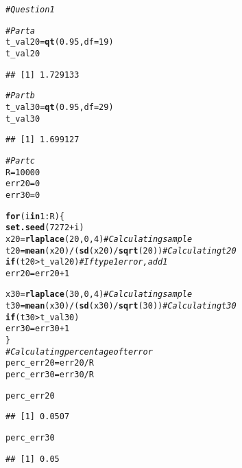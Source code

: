 \documentclass{article}\usepackage[]{graphicx}\usepackage[]{xcolor}
\makeatletter
\newcommand{\hlnum}[1]{\textcolor[rgb]{0.686,0.059,0.569}{#1}}%
\newcommand{\hlcom}[1]{\textcolor[rgb]{0.678,0.584,0.686}{\textit{#1}}}%
\newcommand{\hlopt}[1]{\textcolor[rgb]{0,0,0}{#1}}%
\newcommand{\hldef}[1]{\textcolor[rgb]{0.345,0.345,0.345}{#1}}%
\newcommand{\hlkwa}[1]{\textcolor[rgb]{0.161,0.373,0.58}{\textbf{#1}}}%
\newcommand{\hlkwb}[1]{\textcolor[rgb]{0.69,0.353,0.396}{#1}}%
\newcommand{\hlkwc}[1]{\textcolor[rgb]{0.333,0.667,0.333}{#1}}%
\newcommand{\hlkwd}[1]{\textcolor[rgb]{0.737,0.353,0.396}{\textbf{#1}}}%
\newenvironment{kframe}{%
 \def\at@end@of@kframe{}%
 \ifinner\ifhmode%
  \def\at@end@of@kframe{\end{minipage}}%
  \begin{minipage}{\columnwidth}%
 \fi\fi%
 \def\FrameCommand##1{\hskip\@totalleftmargin \hskip-\fboxsep
 \colorbox{shadecolor}{##1}\hskip-\fboxsep
     \hskip-\linewidth \hskip-\@totalleftmargin \hskip\columnwidth}%
 \MakeFramed {\advance\hsize-\width
   \@totalleftmargin\z@ \linewidth\hsize
   \@setminipage}}%
 {\par\unskip\endMakeFramed%
 \at@end@of@kframe}
\newenvironment{knitrout}{}{} %
\makeatother
\begin{document}
\begin{enumerate}
\begin{enumerate}
\begin{knitrout}
\begin{kframe}
{\ttfamily\noindent\itshape\color{messagecolor}{\#\# Loading required package: splines}}\begin{alltt}
\hlcom{#Question 1}

\hlcom{#Part a}
\hldef{t_val20} \hlkwb{=} \hlkwd{qt}\hldef{(}\hlnum{0.95}\hldef{,} \hlkwc{df}\hldef{=}\hlnum{19}\hldef{)}
\hldef{t_val20}
\end{alltt}
\begin{verbatim}
## [1] 1.729133
\end{verbatim}
\begin{alltt}
\hlcom{#Part b}
\hldef{t_val30} \hlkwb{=} \hlkwd{qt}\hldef{(}\hlnum{0.95}\hldef{,} \hlkwc{df}\hldef{=}\hlnum{29}\hldef{)}
\hldef{t_val30}
\end{alltt}
\begin{verbatim}
## [1] 1.699127
\end{verbatim}
\begin{alltt}
\hlcom{#Part c}
\hldef{R}\hlkwb{=}\hlnum{10000}
\hldef{err20} \hlkwb{=} \hlnum{0}
\hldef{err30} \hlkwb{=} \hlnum{0}

\hlkwa{for}\hldef{(i} \hlkwa{in} \hlnum{1}\hlopt{:}\hldef{R)\{}
\hlkwd{set.seed}\hldef{(}\hlnum{7272}\hlopt{+}\hldef{i)}
\hldef{x20} \hlkwb{=} \hlkwd{rlaplace}\hldef{(}\hlnum{20}\hldef{,}\hlnum{0}\hldef{,}\hlnum{4}\hldef{)} \hlcom{#Calculating sample}
\hldef{t20} \hlkwb{=} \hlkwd{mean}\hldef{(x20)} \hlopt{/} \hldef{(}\hlkwd{sd}\hldef{(x20)}\hlopt{/}\hlkwd{sqrt}\hldef{(}\hlnum{20}\hldef{))} \hlcom{#Calculating t20}
\hlkwa{if} \hldef{(t20}\hlopt{>}\hldef{t_val20)} \hlcom{#If type1 error, add 1}
  \hldef{err20}\hlkwb{=}\hldef{err20}\hlopt{+}\hlnum{1}

\hldef{x30} \hlkwb{=} \hlkwd{rlaplace}\hldef{(}\hlnum{30}\hldef{,}\hlnum{0}\hldef{,}\hlnum{4}\hldef{)} \hlcom{#Calculating sample}
\hldef{t30} \hlkwb{=} \hlkwd{mean}\hldef{(x30)} \hlopt{/} \hldef{(}\hlkwd{sd}\hldef{(x30)}\hlopt{/}\hlkwd{sqrt}\hldef{(}\hlnum{30}\hldef{))} \hlcom{#Calculating t30}
\hlkwa{if} \hldef{(t30}\hlopt{>}\hldef{t_val30)}
  \hldef{err30}\hlkwb{=}\hldef{err30}\hlopt{+}\hlnum{1}
\hldef{\}}
\hlcom{#Calculating percentage of t error}
\hldef{perc_err20} \hlkwb{=} \hldef{err20}\hlopt{/}\hldef{R}
\hldef{perc_err30}\hlkwb{=} \hldef{err30}\hlopt{/}\hldef{R}

\hldef{perc_err20}
\end{alltt}
\begin{verbatim}
## [1] 0.0507
\end{verbatim}
\begin{alltt}
\hldef{perc_err30}
\end{alltt}
\begin{verbatim}
## [1] 0.05
\end{verbatim}
\end{kframe}
\end{knitrout}


\end{enumerate}
\end{enumerate}
\end{document}
